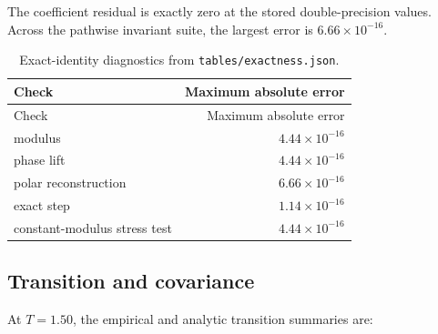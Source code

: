 \documentclass[
  english,
  10pt,
  letterpaper,
  DIV=11,
  numbers=noendperiod]{scrartcl}
\begin{document}
The coefficient residual is exactly zero at the stored double-precision
values. Across the pathwise invariant suite, the largest error is
\(6.66\times10^{-16}\).

\begin{longtable}[]{@{}lr@{}}
\caption{Exact-identity diagnostics from
\protect\texttt{tables/exactness.json}.}\label{tbl-exactness}\tabularnewline
\toprule\noalign{}
Check & Maximum absolute error \\
\midrule\noalign{}
\endfirsthead
\toprule\noalign{}
Check & Maximum absolute error \\
\midrule\noalign{}
\endhead
\bottomrule\noalign{}
\endlastfoot
modulus & \(4.44\times10^{-16}\) \\
phase lift & \(4.44\times10^{-16}\) \\
polar reconstruction & \(6.66\times10^{-16}\) \\
exact step & \(1.14\times10^{-16}\) \\
constant-modulus stress test & \(4.44\times10^{-16}\) \\
\end{longtable}

\subsection{Transition and covariance}\label{transition-and-covariance}

At \(T=1.50\), the empirical and analytic transition summaries are:
\end{document}
